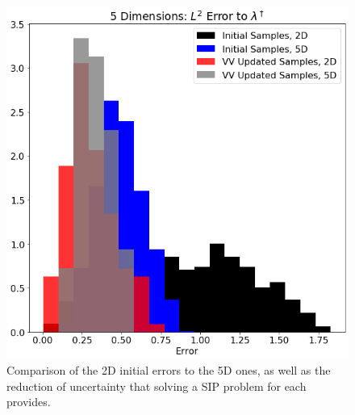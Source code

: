 \begin{figure}[htbp]
\centering
  \includegraphics[width=0.675\linewidth]{figures/pde-highd/pde-highd_hist_D5_t5-0E-01}
\caption{
Comparison of the 2D initial errors to the 5D ones, as well as the reduction of uncertainty that solving a SIP problem for each provides.
}
\label{fig:pde-highd-5d-hist}
\end{figure}
